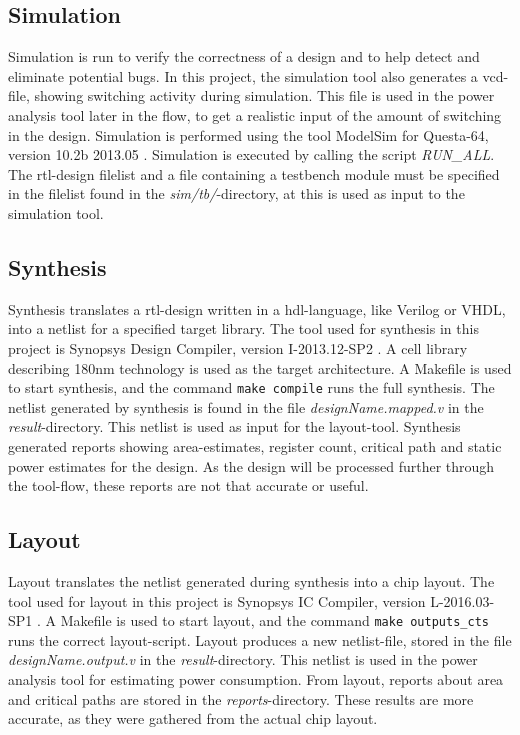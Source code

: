 \subsection{Simulation}
Simulation is run to verify the correctness of a design and to help detect and eliminate potential bugs. In this project, the simulation tool also generates a \gls{vcd}-file, showing switching activity during simulation. This file is used in the power analysis tool later in the flow, to get a realistic input of the amount of switching in the design. Simulation is performed using the tool ModelSim for Questa-64, version 10.2b 2013.05 \cite{questasim}. Simulation is executed by calling the script \textit{RUN\_ALL}. The \gls{rtl}-design filelist and a file containing a testbench module must be specified in the filelist found in the \textit{sim/tb/}-directory, at this is used as input to the simulation tool.
\subsection{Synthesis}
Synthesis translates a \gls{rtl}-design written in a \gls{hdl}-language, like Verilog or VHDL, into a netlist for a specified target library. The tool used for synthesis in this project is Synopsys Design Compiler, version I-2013.12-SP2 \cite{syndescomp}. A cell library describing 180nm technology is used as the target architecture. A Makefile is used to start synthesis, and the command \verb!make compile! runs the full synthesis. The netlist generated by synthesis is found in the file \textit{designName.mapped.v} in the \textit{result}-directory. This netlist is used as input for the layout-tool. Synthesis generated reports showing area-estimates, register count, critical path and static power estimates for the design. As the design will be processed further through the tool-flow, these reports are not that accurate or useful.
\subsection{Layout}
Layout translates the netlist generated during synthesis into a chip layout. The tool used for layout in this project is Synopsys IC Compiler, version L-2016.03-SP1 \cite{syniccomp}. A Makefile is used to start layout, and the command \verb!make outputs_cts! runs the correct layout-script. Layout produces a new netlist-file, stored in the file \textit{designName.output.v} in the \textit{result}-directory. This netlist is used in the power analysis tool for estimating power consumption. From layout, reports about area and critical paths are stored in the \textit{reports}-directory. These results are more accurate, as they were gathered from the actual chip layout.
